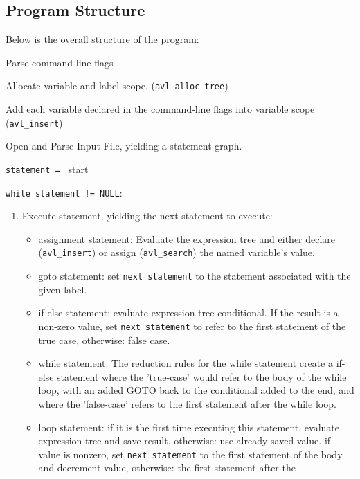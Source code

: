 \documentclass[letterpaper,11pt]{article}
\begin{document}
{{		\subsection{Program Structure}
		{
			Below is the overall structure of the program:
			\begin{enumerate}
			{
				\item Parse command-line flags
				\item Allocate variable and label scope. (\texttt{avl\_alloc\_tree})
				\item Add each variable declared in the command-line flags into
					variable scope (\texttt{avl\_insert})
				\item Open and Parse Input File, yielding a statement graph.
				\item \texttt{statement = } start
				\item \texttt{while statement != NULL}:
				\begin{enumerate}
					\item Execute statement, yielding the next statement to execute:
						\begin{itemize}
							\item assignment statement:
								Evaluate the expression tree and either declare
								(\texttt{avl\_insert}) or assign (\texttt{avl\_search})
								the named variable's value.
							\item goto statement:
								set \texttt{next statement} to the statement
								associated with the given label.
							\item if-else statement:
								evaluate expression-tree conditional. If the
								result is a non-zero value, set
								\texttt{next statement} to refer to the first
								statement of the true case, otherwise: false
								case.
							\item while statement:
								The reduction rules for the while statement
								create a if-else statement where the 'true-case'
								would refer to the body of the while loop, with
								an added GOTO back to the conditional added to
								the end, and where the 'false-case' refers to
								the first statement after the while loop.
							\item loop statement:
								if it is the first time executing this statement,
								evaluate expression tree and save result, otherwise:
								use already saved value.
								if value is nonzero, set \texttt{next statement}
								to the first statement of the body and decrement
								value, otherwise: the first statement after the

\end{itemize}
\end{enumerate}}
\end{enumerate}}}}
\end{document}
